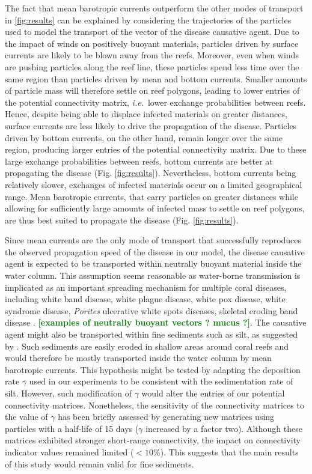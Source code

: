 \documentclass[utf8]{frontiersSCNS}
\newcommand{\ie}{{\it i.e.}\ }
\newcommand{\erinn}[1]{\textbf{\textcolor{green}{#1}}}
\begin{document}
The fact that mean barotropic currents outperform the other modes of transport in \ref{fig:results} can be explained by considering the trajectories of the particles used to model the transport of the vector of the disease causative agent. Due to the impact of winds on positively buoyant materials, particles driven by surface currents are likely to be blown away from the reefs. Moreover, even when winds are pushing particles along the reef line, these particles spend less time over the same region than particles driven by mean and bottom currents. Smaller amounts of particle mass will therefore settle on reef polygons, leading to lower entries of the potential connectivity matrix, \ie lower exchange probabilities between reefs. Hence, despite being able to displace infected materials on greater distances, surface currents are less likely to drive the propagation of the disease. Particles driven by bottom currents, on the other hand, remain longer over the same region, producing larger entries of the potential connectivity matrix. Due to these large exchange probabilities between reefs, bottom currents are better at propagating the disease (Fig. \ref{fig:results}). Nevertheless, bottom currents being relatively slower, exchanges of infected materials occur on a limited geographical range. Mean barotropic currents, that carry particles on greater distances while allowing for sufficiently large amounts of infected mass to settle on reef polygons, are thus best suited to propagate the disease (Fig. \ref{fig:results}).

Since mean currents are the only mode of transport that successfully reproduces the observed propagation speed of the disease in our model, the disease causative agent is expected to be transported within neutrally buoyant material inside the water column. This assumption seems reasonable as water-borne transmission is implicated as an important spreading mechanism for multiple coral diseases, including white band disease, white plague disease, white pox disease, white syndrome disease, \textit{Porites} ulcerative white spots diseases, skeletal eroding band disease \citep{shore2019modes}. \erinn{[examples of neutrally buoyant vectors ? mucus ?]}. The causative agent might also be transported within fine sediments such as silt, as suggested by \cite{rosales2020rhodobacterales}. Such sediments are easily eroded in shallow areas around coral reefs and would therefore be mostly transported inside the water column by mean barotropic currents. This hypothesis might be tested by adapting the deposition rate $\gamma$ used in our experiments to be consistent with the sedimentation rate of silt. However, such modification of $\gamma$ would alter the entries of our potential connectivity matrices. Nonetheless, the sensitivity of the connectivity matrices to the value of $\gamma$ has been briefly assessed by generating new matrices using particles with a half-life of 15 days ($\gamma$ increased by a factor two). Although these matrices exhibited stronger short-range connectivity, the impact on connectivity indicator values remained  limited ($<10\%$). This suggests that the main results of this study would remain valid for fine sediments.  
\end{document}
